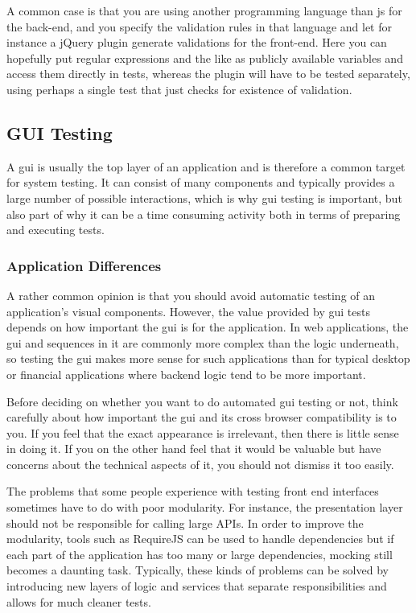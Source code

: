\documentclass[11pt]{article}
\begin{document}
A common case is that you are using another programming language than \gls{js} for the back-end, and you specify the validation rules in that language and let for instance a jQuery plugin generate validations for the front-end. Here you can hopefully put regular expressions and the like as publicly available variables and access them directly in tests, whereas the plugin will have to be tested separately, using perhaps a single test that just checks for existence of validation.

\subsection{GUI Testing}

A \acrfull{gui} is usually the top layer of an application and is therefore a common target for system testing. It can consist of many components and typically provides a large number of possible interactions, which is why \gls{gui} testing is important, but also part of why it can be a time consuming activity both in terms of preparing and executing tests.

\subsubsection{Application Differences}

A rather common opinion is that you should avoid automatic testing of an application's visual components. However, the value provided by \gls{gui} tests depends on how important the \gls{gui} is for the application. In web applications, the \gls{gui} and sequences in it are commonly more complex than the logic underneath, so testing the \gls{gui} makes more sense for such applications than for typical desktop or financial applications where backend logic tend to be more important. \cite[question~21]{Ahnve}

Before deciding on whether you want to do automated \gls{gui} testing or not, think carefully about how important the \gls{gui} and its cross browser compatibility is to you. If you feel that the exact appearance is irrelevant, then there is little sense in doing it. If you on the other hand feel that it would be valuable but have concerns about the technical aspects of it, you should not dismiss it too easily.

The problems that some people experience with testing front end interfaces sometimes have to do with poor modularity. For instance, the presentation layer should not be responsible for calling large APIs. In order to improve the modularity, tools such as RequireJS can be used to handle dependencies but if each part of the application has too many or large dependencies, mocking still becomes a daunting task. Typically, these kinds of problems can be solved by introducing new layers of logic and services that separate responsibilities and allows for much cleaner tests. \cite[question~23]{Edelstam}
\end{document}
